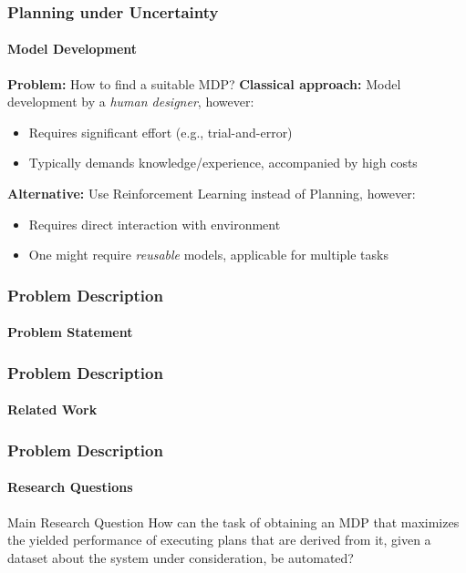 \begin{frame}
	\frametitle{Planning under Uncertainty}
	\framesubtitle{Model Development}
	
	\textcolor{tudBlack}{\textbf{Problem:}} How to find a suitable MDP?
	\pause
	\vfill
	\textcolor{tudBlack}{\textbf{Classical approach:}} Model development by a \textit{human designer}, however:
	\begin{itemize}
		\item Requires significant effort (e.g., trial-and-error)
		\item Typically demands knowledge/experience, accompanied by high costs
	\end{itemize}
	\pause
	\vfill
	\textcolor{tudBlack}{\textbf{Alternative:}} Use Reinforcement Learning instead of Planning, however:
	\begin{itemize}
		\item Requires direct interaction with environment %
		\item One might require \textit{reusable} models, applicable for multiple tasks %
	\end{itemize}
\end{frame}

\begin{frame}
\frametitle{Problem Description}
\framesubtitle{Problem Statement}



\end{frame}

\begin{frame}
\frametitle{Problem Description}
\framesubtitle{Related Work}



\end{frame}

\begin{frame}
\frametitle{Problem Description}
\framesubtitle{Research Questions}

\begin{block}{Main Research Question}
How can the task of obtaining an MDP that maximizes the yielded performance of executing plans that are derived from it, given a dataset about the system under consideration, be automated? %
\end{block}

\end{frame}